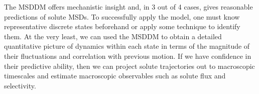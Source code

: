 \documentclass{article}
\begin{document}
  The MSDDM offers mechanistic insight and, in 3 out of 4 cases, gives reasonable
  predictions of solute MSDs. To successfully apply the model, one must know 
  representative discrete states beforehand or apply some technique to identify
  them. At the very least, we can used the MSDDM to obtain a detailed quantitative
  picture of dynamics within each state in terms of the magnitude of their 
  fluctuations and correlation with previous motion. If we have confidence in
  their predictive ability, then we can project solute trajectories out to 
  macroscopic timescales and estimate macroscopic observables such as solute 
  flux and selectivity.
  
  
%  
  
\end{document}

